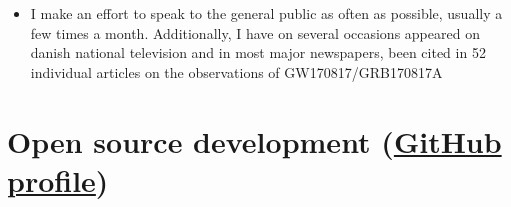 \documentclass[12pt,letterpaper]{article}
\begin{document}
\begin{itemize}
	\item I make an effort to speak to the general public as often as possible, usually a few times a month. Additionally, I have on several occasions appeared on danish national television and in most major newspapers, been cited in 52 individual articles on the observations of GW170817/GRB170817A

    
\end{itemize}

\section*{Open source development (\href{https://github.com/jselsing}{GitHub profile})}
\end{document}
